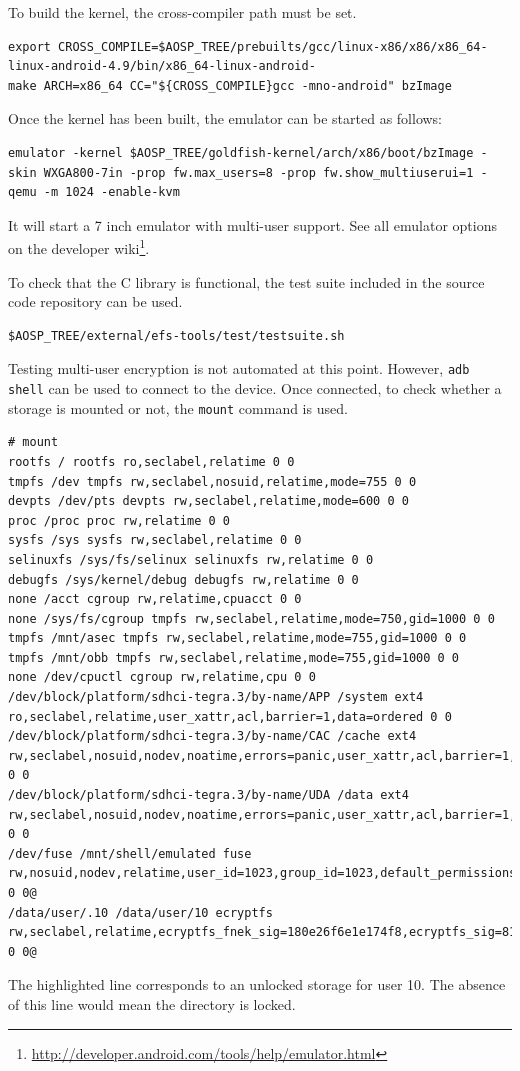 To build the kernel, the cross-compiler path must be set.
\begin{lstlisting}[numbers=none]
export CROSS_COMPILE=$AOSP_TREE/prebuilts/gcc/linux-x86/x86/x86_64-linux-android-4.9/bin/x86_64-linux-android-
make ARCH=x86_64 CC="${CROSS_COMPILE}gcc -mno-android" bzImage
\end{lstlisting}

Once the kernel has been built, the emulator can be started as follows:
\begin{lstlisting}[numbers=none]
 emulator -kernel $AOSP_TREE/goldfish-kernel/arch/x86/boot/bzImage -skin WXGA800-7in -prop fw.max_users=8 -prop fw.show_multiuserui=1 -qemu -m 1024 -enable-kvm
\end{lstlisting}
It will start a 7 inch emulator with multi-user support. See all emulator options on the developer wiki\footnote{\url{http://developer.android.com/tools/help/emulator.html}}.

To check that the C library is functional, the test suite included in the source code repository can be used.
\begin{lstlisting}[numbers=none]
$AOSP_TREE/external/efs-tools/test/testsuite.sh
\end{lstlisting}

Testing multi-user encryption is not automated at this point. However, \texttt{adb shell} can be used to connect to the device. Once connected, to check whether a storage is mounted or not, the \texttt{mount} command is used.

\begin{lstlisting}[numbers=none, style=custom2]
# mount
rootfs / rootfs ro,seclabel,relatime 0 0
tmpfs /dev tmpfs rw,seclabel,nosuid,relatime,mode=755 0 0
devpts /dev/pts devpts rw,seclabel,relatime,mode=600 0 0
proc /proc proc rw,relatime 0 0
sysfs /sys sysfs rw,seclabel,relatime 0 0
selinuxfs /sys/fs/selinux selinuxfs rw,relatime 0 0
debugfs /sys/kernel/debug debugfs rw,relatime 0 0
none /acct cgroup rw,relatime,cpuacct 0 0
none /sys/fs/cgroup tmpfs rw,seclabel,relatime,mode=750,gid=1000 0 0
tmpfs /mnt/asec tmpfs rw,seclabel,relatime,mode=755,gid=1000 0 0
tmpfs /mnt/obb tmpfs rw,seclabel,relatime,mode=755,gid=1000 0 0
none /dev/cpuctl cgroup rw,relatime,cpu 0 0
/dev/block/platform/sdhci-tegra.3/by-name/APP /system ext4 ro,seclabel,relatime,user_xattr,acl,barrier=1,data=ordered 0 0
/dev/block/platform/sdhci-tegra.3/by-name/CAC /cache ext4 rw,seclabel,nosuid,nodev,noatime,errors=panic,user_xattr,acl,barrier=1,nomblk_io_submit,data=ordered 0 0
/dev/block/platform/sdhci-tegra.3/by-name/UDA /data ext4 rw,seclabel,nosuid,nodev,noatime,errors=panic,user_xattr,acl,barrier=1,nomblk_io_submit,data=ordered 0 0
/dev/fuse /mnt/shell/emulated fuse rw,nosuid,nodev,relatime,user_id=1023,group_id=1023,default_permissions,allow_other 0 0@
/data/user/.10 /data/user/10 ecryptfs rw,seclabel,relatime,ecryptfs_fnek_sig=180e26f6e1e174f8,ecryptfs_sig=81661eb0fc6a797b,ecryptfs_cipher=aes,ecryptfs_key_bytes=32 0 0@
\end{lstlisting}

The highlighted line corresponds to an unlocked storage for user 10. The absence of this line would mean the directory is locked.
